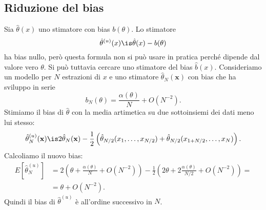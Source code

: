 \subsection{Riduzione del bias}

Sia $\hat\theta(x)$ uno stimatore con bias $b(\theta)$.
Lo stimatore
\begin{equation*}
	\hat\theta^{(u)}(x)
	\is \hat\theta(x) - b(\theta)
\end{equation*}
ha bias nullo,
però questa formula non si può usare in pratica perché dipende dal valore vero $\theta$.
Si può tuttavia cercare uno stimatore del bias $\hat b(x)$.
Consideriamo un modello per $N$ estrazioni di $x$
e uno stimatore $\hat\theta_N(\mathbf x)$
con bias che ha sviluppo in serie
\begin{equation*}
	b_N(\theta)
	= \frac{\alpha(\theta)}N + O(N^{-2}).
\end{equation*}
Stimiamo il bias di $\hat\theta$ con la media artimetica su due sottoinsiemi dei dati meno lui stesso:
\begin{equation*}
	\hat\theta^{(u)}_N(\mathbf x)
	\is 2\hat\theta_N(\mathbf x)
	- \frac12 \left( \hat\theta_{N/2}(x_1,\dots,x_{N/2}) + \hat\theta_{N/2}(x_{1+N/2},\dots,x_N) \right).
\end{equation*}
Calcoliamo il nuovo bias:
\begin{align*}
	E[\hat\theta^{(u)}_N]
	&= 2 \left( \theta + \frac{\alpha(\theta)}N + O(N^{-2}) \right)
	- \frac12 \left( 2\theta + 2 \frac{\alpha(\theta)}{N/2} + O(N^{-2}) \right) = \\
	&= \theta + O(N^{-2}).
\end{align*}
Quindi il bias di $\hat\theta^{(u)}$ è all'ordine successivo in $N$.

